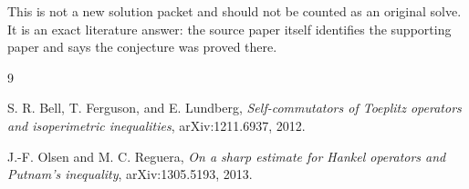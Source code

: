 \documentclass[11pt]{article}
\begin{document}
This is not a new solution packet and should not be counted as an original
solve.  It is an exact literature answer: the source paper itself identifies
the supporting paper and says the conjecture was proved there.

\begin{thebibliography}{9}

S. R. Bell, T. Ferguson, and E. Lundberg,
\emph{Self-commutators of Toeplitz operators and isoperimetric inequalities},
arXiv:1211.6937, 2012.

J.-F. Olsen and M. C. Reguera,
\emph{On a sharp estimate for Hankel operators and Putnam's inequality},
arXiv:1305.5193, 2013.

\end{thebibliography}
\end{document}
